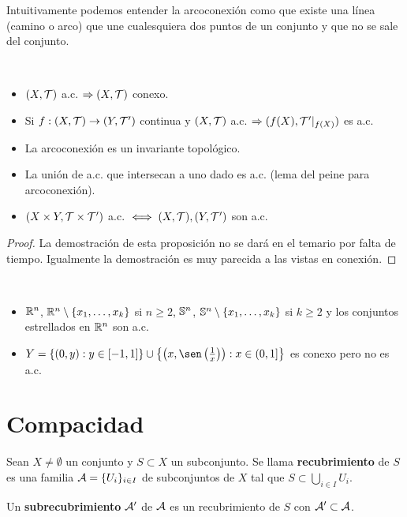 Intuitivamente podemos entender la arcoconexión como que existe una línea (camino o arco) que une cualesquiera dos puntos de un conjunto y que no se sale del conjunto.

\begin{prop}\
    \begin{itemize}
        \item $(X, \mathcal{T})$ a.c. $\Rightarrow (X, \mathcal{T})$ conexo.
        \item Si $f:(X, \mathcal{T})\to (Y, \mathcal{T}')$ continua y $(X, \mathcal{T})$ a.c. $\Rightarrow (f(X), \mathcal{T}'|_{f(X)})$ es a.c.
        \item La arcoconexión es un invariante topológico.
        \item La unión de a.c. que intersecan a uno dado es a.c. (lema del peine para arcoconexión).
        \item $(X\times Y, \mathcal{T}\times \mathcal{T}')$ a.c. $\iff (X, \mathcal{T}), (Y, \mathcal{T}')$ son a.c.
    \end{itemize}
    \begin{proof}
        La demostración de esta proposición no se dará en el temario por falta de tiempo. Igualmente la demostración es muy parecida a las vistas en conexión.
    \end{proof}
\end{prop}

\begin{ejemplo}\
    \begin{itemize}
        \item $\mathbb{R}^n$, $\mathbb{R}^n\setminus \{x_1,\dots,x_k\}$ si $n\geq 2$, $\mathbb{S}^n$, $\mathbb{S}^n\setminus \{x_1,\dots,x_k\}$ si $k\geq 2$ y los conjuntos estrellados en $\mathbb{R}^n$ son a.c.
        \item $Y=\{(0,y):y\in [-1,1]\}\cup \left\{\left(x,\sen\left(\frac{1}{x}\right)\right): x\in (0,1]\right\}$ es conexo pero no es a.c.
    \end{itemize}
    \endsquare
\end{ejemplo}

\section{Compacidad}

\begin{definicion}
    Sean $X\neq \emptyset$ un conjunto y $S\subset X$ un subconjunto. Se llama \textbf{recubrimiento} de $S$ es una familia $\mathcal{A}=\{U_i\}_{i\in I}$ de subconjuntos de $X$ tal que $S\subset \bigcup\limits_{i\in I}U_i$.

    Un \textbf{subrecubrimiento} $\mathcal{A}'$ de $\mathcal{A}$ es un recubrimiento de $S$ con $\mathcal{A}'\subset\mathcal{A}$.
    \endsquare
\end{definicion}

